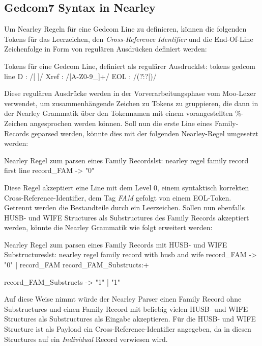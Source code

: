 \subsection{Gedcom7 Syntax in Nearley}
\label{subsec: Implementierung - Gedcom Grammatik - Gedcom7 Syntax in Nearley}
Um Nearley Regeln für eine Gedcom Line zu definieren, können die folgenden Tokens für das Leerzeichen, den \textit{Cross-Reference Identifier} und die End-Of-Line Zeichenfolge in Form von regulären Ausdrücken definiert werden:
\vspace{1em}
\begin{javascript}{Tokens für eine Gedcom Line, definiert als regulärer Ausdruck}{lst: tokens gedcom line}
	D    : /[ ]/
	Xref : /\@[A-Z0-9\_]+\@/	
	EOL  : /(?:\r\n?|\n)/
\end{javascript}
\newpage
Diese regulären Ausdrücke werden in der Vorverarbeitungsphase vom Moo-Lexer verwendet, um zusammenhängende Zeichen zu Tokens zu gruppieren, die dann in der Nearley Grammatik über den Tokennamen mit einem vorangestellten \%-Zeichen angesprochen werden können. Soll nun die erste Line eines Family-Records geparsed werden, könnte dies mit der folgenden Nearley-Regel umgesetzt werden:
\vspace{1em}
\begin{javascript}{Nearley Regel zum parsen eines Family Records}{lst: nearley regel family record first line}
	record_FAM -> "0"  %
\end{javascript}
\vspace{1em}
Diese Regel akzeptiert eine Line mit dem Level 0, einem syntaktisch korrekten Cross-Reference-Identifier, dem Tag \textit{FAM} gefolgt von einem EOL-Token. Getrennt werden die Bestandteile durch ein Leerzeichen. Sollen nun ebenfalls HUSB- und WIFE Structures als Substructures des Family Records akzeptiert werden, könnte die Nearley Grammatik wie folgt erweitert werden:
\vspace{1em}
\begin{javascript}{Nearley Regel zum parsen eines Family Records mit HUSB- und WIFE Substructures}{lst: nearley regel family record with husb and wife}
	record_FAM
		-> "0"  %
		|  record_FAM  record_FAM_Substructs:+
	
	record_FAM_Substructs 
		-> "1"  %
		|  "1"  %
\end{javascript}
\vspace{1em}
Auf diese Weise nimmt würde der Nearley Parser einen Family Record ohne Substructures und einen Family Record mit beliebig vielen HUSB- und WIFE Structures als Substructures als Eingabe akzeptieren. Für die HUSB- und WIFE Structure ist als Payload ein Cross-Reference-Identifier angegeben, da in diesen Structures auf ein \textit{Individual} Record verwiesen wird.


